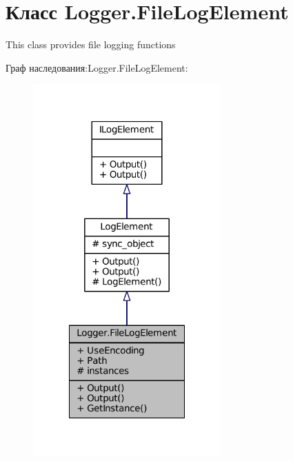 \hypertarget{class_logger_1_1_file_log_element}{}\section{Класс Logger.\+File\+Log\+Element}
\label{class_logger_1_1_file_log_element}


This class provides file logging functions  




Граф наследования\+:Logger.\+File\+Log\+Element\+:
\nopagebreak
\begin{figure}[H]
\begin{center}
\leavevmode
\includegraphics[width=204pt]{class_logger_1_1_file_log_element__inherit__graph}
\end{center}
\end{figure}


